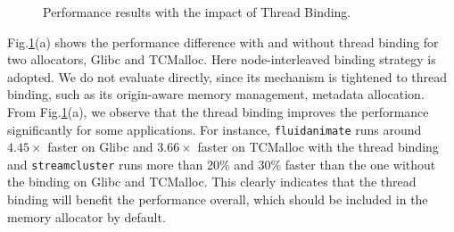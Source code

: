 
\begin{figure}[!h]
\centering
{}

\caption{Performance results with the impact of Thread Binding.}
\label{binding-pthread-scalibity}
\end{figure}

Fig.\ref{binding-pthread-scalibity}(a) shows the performance difference with and without thread binding for two allocators, Glibc and TCMalloc. Here node-interleaved binding strategy is adopted. We do not evaluate \NM{} directly, since its mechanism is tightened to thread binding, such as its origin-aware memory management, metadata allocation. From Fig.\ref{binding-pthread-scalibity}(a), we observe that the thread binding improves the performance significantly for some applications. For instance, \texttt{fluidanimate} runs around $4.45\times$ faster on Glibc and $3.66\times$ faster on TCMalloc with the thread binding and \texttt{streamcluster} runs more than 20\% and 30\% faster than the one without the binding on Glibc and TCMalloc. This clearly indicates that the thread binding will benefit the performance overall, which should be included in the memory allocator by default. 

